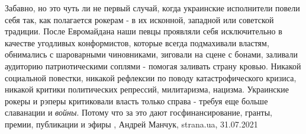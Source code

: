 Забавно, но это чуть ли не первый случай, когда украинские исполнители повели
себя так, как полагается рокерам - в их исконной, западной или советской
традиции. После Евромайдана наши певцы проявляли себя исключительно в качестве
угодливых конформистов, которые всегда подмахивали властям, обнимались с
шароварными чиновниками, зиговали на сцене с бонами, заливали аудиторию
патриотическими соплями - помогая заливать страну кровью.  Никакой социальной
повестки, никакой рефлексии по поводу катастрофического кризиса, никакой
критики политических репрессий, милитаризма, нацизма. Украинские рокеры и
рэперы критиковали власть только справа - требуя еще больше славанации и \emph{войны}.
Потому что за это дают госфинансирование, гранты, премии, публикации и эфиры
, Андрей Манчук, strana.ua, 31.07.2021
